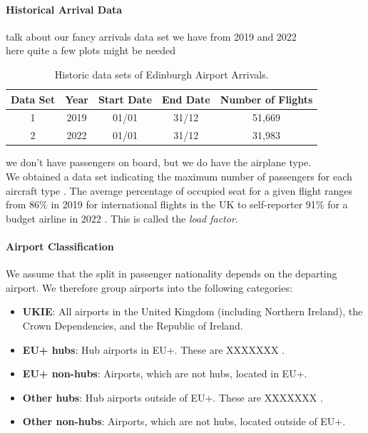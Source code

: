 \documentclass[10pt]{article}
\begin{document}
\paragraph{Historical Arrival Data}
talk about our fancy arrivals data set we have from 2019 and 2022 \\
here quite a few plots might be needed 


\begin{table}[!ht]
\caption{Historic data sets of Edinburgh Airport Arrivals.}
\label{tab:observed_arrivals_overview}
\centering
\begin{tabular}{ccccc}
\hline
\multicolumn{1}{c}{\textbf{Data Set}} & \textbf{Year} & \textbf{Start Date} & \textbf{End Date} & \textbf{Number of Flights} \\ \hline
1  & 2019  & 01/01  & 31/12    &  51,669  \\
2  & 2022  & 01/01  & 31/12    &  31,983  \\
 \hline
\end{tabular}
\end{table}


we don't have passengers on board, but we do have the airplane type. \\
We obtained a data set indicating the maximum number of passengers for each aircraft type \cite{aircraft_capacity}. The average percentage of occupied seat for a given flight ranges from 86\% in 2019 for international flights in the UK \cite{loading_factor_national} to self-reporter 91\% for a budget airline in 2022 \cite{loading_factor_ryanair}. This is called the \textit{load factor}.

\paragraph{Airport Classification}
We assume that the split in passenger nationality depends on the departing airport. We therefore group airports into the following categories: 
\begin{itemize}
    \item \textbf{UKIE}: All airports in the United Kingdom (including Northern Ireland), the Crown Dependencies, and the Republic of Ireland.
    \item \textbf{EU+ hubs}: Hub airports in EU+. These are XXXXXXX \cite{mega_hubs}.
    \item \textbf{EU+ non-hubs}: Airports, which are not hubs, located in EU+.
    \item \textbf{Other hubs}: Hub airports outside of EU+. These are XXXXXXX \cite{mega_hubs}.
    \item \textbf{Other non-hubs}: Airports, which are not hubs, located outside of EU+.
\end{itemize}
\end{document}
